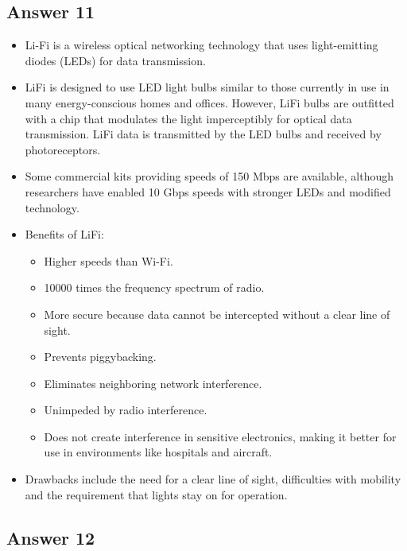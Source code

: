 \documentclass[]{article}
\begin{document}
\subsection{Answer 11}\label{answer-11}

\begin{itemize}
\itemsep1pt\parskip0pt
\item
  Li-Fi is a wireless optical networking technology that uses
  light-emitting diodes (LEDs) for data transmission.
\item
  LiFi is designed to use LED light bulbs similar to those currently in
  use in many energy-conscious homes and offices. However, LiFi bulbs
  are outfitted with a chip that modulates the light imperceptibly for
  optical data transmission. LiFi data is transmitted by the LED bulbs
  and received by photoreceptors.
\item
  Some commercial kits providing speeds of 150 Mbps are available,
  although researchers have enabled 10 Gbps speeds with stronger LEDs
  and modified technology.
\item
  Benefits of LiFi:

  \begin{itemize}
  \itemsep1pt\parskip0pt
  \item
    Higher speeds than Wi-Fi.
  \item
    10000 times the frequency spectrum of radio.
  \item
    More secure because data cannot be intercepted without a clear line
    of sight.
  \item
    Prevents piggybacking.
  \item
    Eliminates neighboring network interference.
  \item
    Unimpeded by radio interference.
  \item
    Does not create interference in sensitive electronics, making it
    better for use in environments like hospitals and aircraft.
  \end{itemize}
\item
  Drawbacks include the need for a clear line of sight, difficulties
  with mobility and the requirement that lights stay on for operation.
\end{itemize}

\subsection{Answer 12}\label{answer-12}
\end{document}
